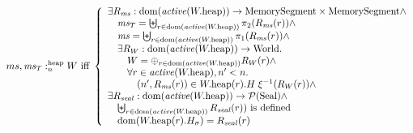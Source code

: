 \documentclass[a4paper]{article}
\begin{document}
\[
  \memSatHeap{ms,\ms_T}{W} \text{ iff } 
  \left\{
    \begin{array}{l}
      \exists R_\ms : \dom(\activeReg{\pwheap}) \fun \MemSeg \times \MemSeg \wedge \\
      \quad \ms_T = \biguplus_{r \in \dom(\activeReg{\pwheap})} \pi_2(R_\ms(r)) \wedge \\
      \quad \ms = \biguplus_{r \in \dom(\activeReg{\pwheap})} \pi_1(R_\ms(r)) \wedge \\
      \quad \exists R_W : \dom(\activeReg{\pwheap}) \fun \World\ldotp\\
      \qquad W = \oplus_{r \in \dom(\activeReg{\pwheap})} R_W(r) \wedge\\
      \qquad \forall r \in \activeReg{\pwheap}, n' < n \ldotp \\
      \qquad \quad \npair[n']{R_\ms(r)} \in  \pwheap(r).H \; \xi^{-1}(R_W(r)) \wedge\\
      \exists R_\var{seal} : \dom(\activeReg{\pwheap}) \fun \powerset{\Seal} \wedge\\
      \quad \biguplus_{r \in \dom(\activeReg{\pwheap})} R_\var{seal}(r)) \text{ is defined }\\
      \quad \dom(\pwheap(r).H_\sigma) = R_\var{seal}(r)
    \end{array}
  \right.
\]
\end{document}
